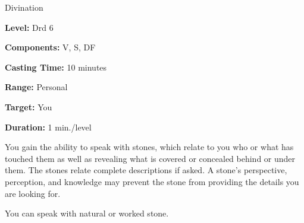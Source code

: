 
Divination

\textbf{Level:} Drd 6

\textbf{Components:} V, S, DF

\textbf{Casting Time:} 10 minutes

\textbf{Range:} Personal

\textbf{Target:} You

\textbf{Duration:} 1 min./level

You gain the ability to speak with stones, which relate to you who or what has 
touched them as well as revealing what is covered or concealed behind or under 
them. The stones relate complete descriptions if asked. A stone's perspective, 
perception, and knowledge may prevent the stone from providing the details you 
are looking for.

You can speak with natural or worked stone.

